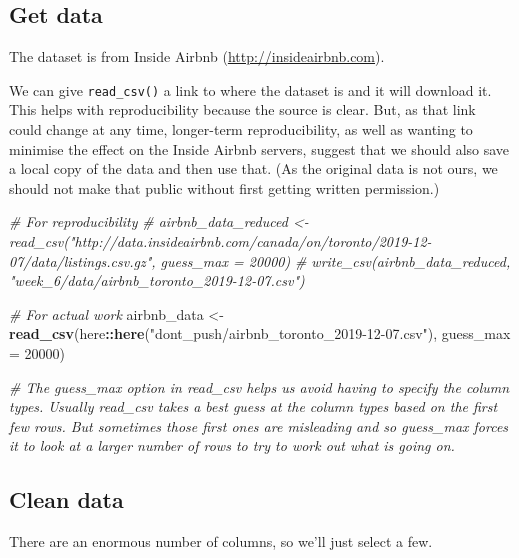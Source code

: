 \documentclass[
]{book}
\newenvironment{Shaded}{\begin{snugshade}}{\end{snugshade}}
\newcommand{\CommentTok}[1]{\textcolor[rgb]{0.56,0.35,0.01}{\textit{#1}}}
\newcommand{\DataTypeTok}[1]{\textcolor[rgb]{0.13,0.29,0.53}{#1}}
\newcommand{\DecValTok}[1]{\textcolor[rgb]{0.00,0.00,0.81}{#1}}
\newcommand{\KeywordTok}[1]{\textcolor[rgb]{0.13,0.29,0.53}{\textbf{#1}}}
\newcommand{\NormalTok}[1]{#1}
\newcommand{\OperatorTok}[1]{\textcolor[rgb]{0.81,0.36,0.00}{\textbf{#1}}}
\newcommand{\StringTok}[1]{\textcolor[rgb]{0.31,0.60,0.02}{#1}}
\begin{document}
\hypertarget{get-data}{%
\subsection{Get data}\label{get-data}}

The dataset is from Inside Airbnb (\url{http://insideairbnb.com}).

We can give \texttt{read\_csv()} a link to where the dataset is and it will download it. This helps with reproducibility because the source is clear. But, as that link could change at any time, longer-term reproducibility, as well as wanting to minimise the effect on the Inside Airbnb servers, suggest that we should also save a local copy of the data and then use that. (As the original data is not ours, we should not make that public without first getting written permission.)

\begin{Shaded}
\begin{Highlighting}[]
\CommentTok{# For reproducibility}
\CommentTok{# airbnb_data_reduced <- read_csv("http://data.insideairbnb.com/canada/on/toronto/2019-12-07/data/listings.csv.gz", guess_max = 20000)}
\CommentTok{# write_csv(airbnb_data_reduced, "week_6/data/airbnb_toronto_2019-12-07.csv")}

\CommentTok{# For actual work}
\NormalTok{airbnb_data <-}\StringTok{ }\KeywordTok{read_csv}\NormalTok{(here}\OperatorTok{::}\KeywordTok{here}\NormalTok{(}\StringTok{"dont_push/airbnb_toronto_2019-12-07.csv"}\NormalTok{), }\DataTypeTok{guess_max =} \DecValTok{20000}\NormalTok{)}

\CommentTok{# The guess_max option in read_csv helps us avoid having to specify the column types. Usually read_csv takes a best guess at the column types based on the first few rows. But sometimes those first ones are misleading and so guess_max forces it to look at a larger number of rows to try to work out what is going on.}
\end{Highlighting}
\end{Shaded}

\hypertarget{clean-data-1}{%
\subsection{Clean data}\label{clean-data-1}}

There are an enormous number of columns, so we'll just select a few.

\begin{Shaded}
\end{Shaded}
\end{document}
